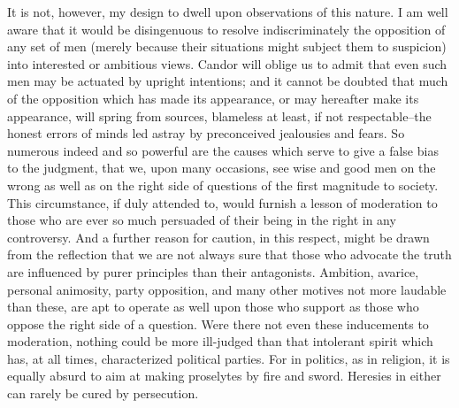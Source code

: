It is not, however, my design to dwell upon observations of this nature. 
I am well aware that it would be disingenuous to resolve indiscriminately the opposition of any set of men (merely because their situations might subject them to suspicion) into interested or ambitious views. 
Candor will oblige us to admit that even such men may be actuated by upright intentions; and it cannot be doubted that much of the opposition which has made its appearance, or may hereafter make its appearance, will spring from sources, blameless at least, if not respectable--the honest errors of minds led astray by preconceived jealousies and fears. 
So numerous indeed and so powerful are the causes which serve to give a false bias to the judgment, that we, upon many occasions, see wise and good men on the wrong as well as on the right side of questions of the first magnitude to society. 
This circumstance, if duly attended to, would furnish a lesson of moderation to those who are ever so much persuaded of their being in the right in any controversy. 
And a further reason for caution, in this respect, might be drawn from the reflection that we are not always sure that those who advocate the truth are influenced by purer principles than their antagonists. 
Ambition, avarice, personal animosity, party opposition, and many other motives not more laudable than these, are apt to operate as well upon those who support as those who oppose the right side of a question. 
Were there not even these inducements to moderation, nothing could be more ill-judged than that intolerant spirit which has, at all times, characterized political parties. 
For in politics, as in religion, it is equally absurd to aim at making proselytes by fire and sword. 
Heresies in either can rarely be cured by persecution.

